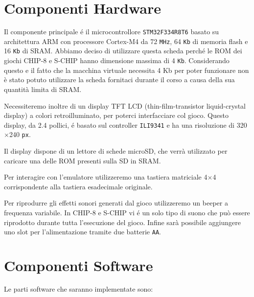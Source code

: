 \documentclass[a4paper]{article}
\begin{document}
\section{Componenti Hardware}



Il componente principale é il microcontrollore \texttt{STM32F334R8T6} basato su architettura ARM con processore Cortex-M4 da 72 \texttt{MHz}, 64 \texttt{Kb} di memoria flash e 16 \texttt{Kb} di SRAM. Abbiamo deciso di utilizzare questa scheda perché le ROM dei giochi CHIP-8 e S-CHIP hanno dimensione massima di 4 \texttt{Kb}. Considerando questo e il fatto che la macchina virtuale necessita 4 Kb per poter funzionare non è stato potuto utilizzare la scheda fornitaci durante il corso a causa della sua quantità limita di SRAM.

Necessiteremo inoltre di un display TFT LCD (thin-film-transistor liquid-crystal display) a colori retroilluminato, per poterci interfacciare col gioco. Questo display, da 2.4 pollici, é basato sul controller \texttt{ILI9341} e ha una risoluzione di 320$\times$240 \texttt{px}.

Il display dispone di un lettore di schede microSD, che verrà utilizzato per caricare una delle ROM presenti sulla SD in SRAM.

Per interagire con l'emulatore utilizzeremo una tastiera matriciale 4$\times$4 corrispondente alla tastiera esadecimale originale.

Per riprodurre gli effetti sonori generati dal gioco utilizzeremo un beeper a frequenza variabile. In CHIP-8 e S-CHIP vi é un solo tipo di suono che può essere riprodotto durante tutta l'esecuzione del gioco. Infine sarà possibile aggiungere uno slot per l'alimentazione tramite due batterie \texttt{AA}.

\section{Componenti Software}

Le parti software che saranno implementate sono:
\end{document}
